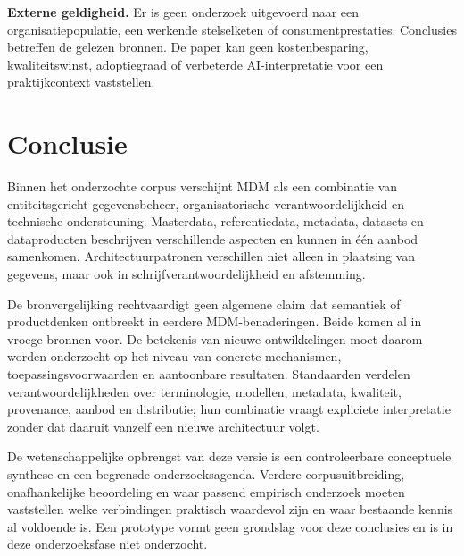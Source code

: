 \textbf{Externe geldigheid.} Er is geen onderzoek uitgevoerd naar een organisatiepopulatie, een werkende stelselketen of consumentprestaties. Conclusies betreffen de gelezen bronnen. De paper kan geen kostenbesparing, kwaliteitswinst, adoptiegraad of verbeterde AI-interpretatie voor een praktijkcontext vaststellen.

\section{Conclusie}
Binnen het onderzochte corpus verschijnt MDM als een combinatie van entiteitsgericht gegevensbeheer, organisatorische verantwoordelijkheid en technische ondersteuning. Masterdata, referentiedata, metadata, datasets en dataproducten beschrijven verschillende aspecten en kunnen in één aanbod samenkomen. Architectuurpatronen verschillen niet alleen in plaatsing van gegevens, maar ook in schrijfverantwoordelijkheid en afstemming.

De bronvergelijking rechtvaardigt geen algemene claim dat semantiek of productdenken ontbreekt in eerdere MDM-benaderingen. Beide komen al in vroege bronnen voor. De betekenis van nieuwe ontwikkelingen moet daarom worden onderzocht op het niveau van concrete mechanismen, toepassingsvoorwaarden en aantoonbare resultaten. Standaarden verdelen verantwoordelijkheden over terminologie, modellen, metadata, kwaliteit, provenance, aanbod en distributie; hun combinatie vraagt expliciete interpretatie zonder dat daaruit vanzelf een nieuwe architectuur volgt.

De wetenschappelijke opbrengst van deze versie is een controleerbare conceptuele synthese en een begrensde onderzoeksagenda. Verdere corpusuitbreiding, onafhankelijke beoordeling en waar passend empirisch onderzoek moeten vaststellen welke verbindingen praktisch waardevol zijn en waar bestaande kennis al voldoende is. Een prototype vormt geen grondslag voor deze conclusies en is in deze onderzoeksfase niet onderzocht.
